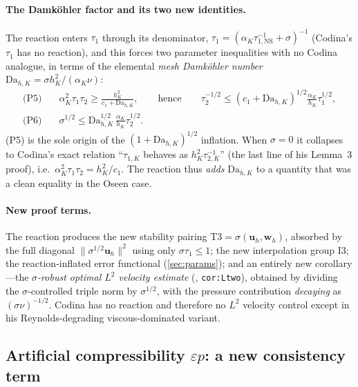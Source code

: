 \documentclass[11pt]{article}
\theoremstyle{remark}
\newcommand{\bu}{\boldsymbol{u}}
\newcommand{\bw}{\boldsymbol{w}}
\newcommand{\norm}[1]{\lVert #1 \rVert}
\newcommand{\tns}{\tau_{1,\mathrm{NS}}}
\newcommand{\Dah}{\mathrm{Da}_{h,K}}
\begin{document}
\paragraph{The Damk\"ohler factor and its two new identities.} The reaction enters $\tau_1$
through its denominator, $\tau_1=(\alpha_K\tns^{-1}+\sigma)^{-1}$ (Codina's $\tau_1$ has no
reaction), and this forces two parameter inequalities with no Codina analogue, in terms of
the elemental \emph{mesh Damk\"ohler number} $\Dah=\sigma h_K^2/(\alpha_K\nu)$:
\begin{align}
  \text{(P5)}\quad & \alpha_K^2\tau_1\tau_2\ge\frac{h_K^2}{c_1+\Dah},
  \qquad\text{hence}\qquad \tau_2^{-1/2}\le(c_1+\Dah)^{1/2}\tfrac{\alpha_K}{h_K}\tau_1^{1/2}, \\
  \text{(P6)}\quad & \sigma^{1/2}\le\Dah^{1/2}\,\tfrac{\alpha_K}{h_K}\tau_2^{1/2}.
\end{align}
(P5) is the sole origin of the $(1+\Dah)^{1/2}$ inflation. When $\sigma=0$ it collapses to
Codina's exact relation ``$\tau_{1,K}$ behaves as $h_K^2\tau_{2,K}^{-1}$'' (the last line of
his Lemma~3 proof), i.e.\ $\alpha_K^2\tau_1\tau_2=h_K^2/c_1$. The reaction thus \emph{adds}
$\Dah$ to a quantity that was a clean equality in the Oseen case.

\paragraph{New proof terms.} The reaction produces the new stability pairing
$\mathrm{T3}=\sigma(\bu_h,\bw_h)$, absorbed by the full diagonal $\norm{\sigma^{1/2}\bu_h}^2$
using only $\sigma\tau_1\le1$; the new interpolation group I3; the reaction-inflated error
functional (\cref{sec:params}); and an entirely new corollary---the \emph{$\sigma$-robust
optimal $L^2$ velocity estimate} (\cite{osgsnote}, \texttt{cor:Ltwo}), obtained by dividing
the $\sigma$-controlled triple norm by $\sigma^{1/2}$, with the pressure contribution
\emph{decaying} as $(\sigma\nu)^{-1/2}$. Codina has no reaction and therefore no $L^2$
velocity control except in his Reynolds-degrading viscous-dominated variant.

\subsection{Artificial compressibility \texorpdfstring{$\varepsilon p$}{eps p}: a new consistency term}
\label{sec:eps}
\end{document}
